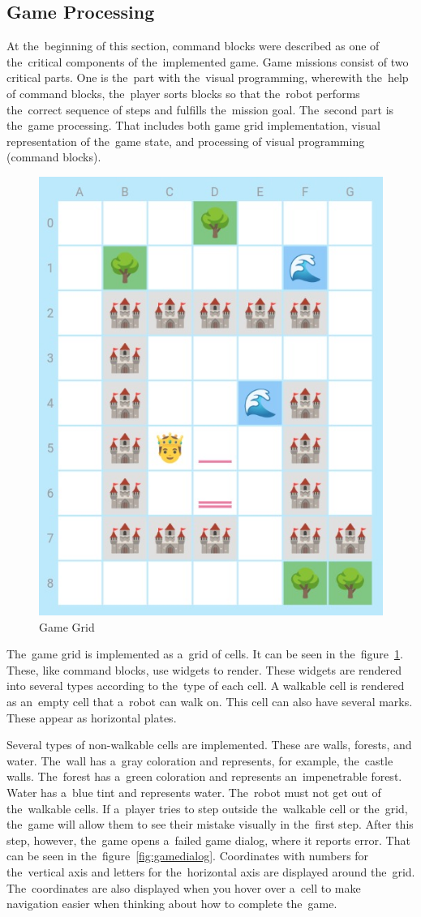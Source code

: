 \subsection{Game Processing}

At the~beginning of this section, command blocks were described as one of the~critical components of the~implemented game.
Game missions consist of two critical parts.
One is the~part with the~visual programming, wherewith the~help of command blocks, the~player sorts blocks so that the~robot performs the~correct sequence of steps and fulfills the~mission goal.
The~second part is the~game processing.
That includes both game grid implementation, visual representation of the~game state, and processing of visual programming (command blocks).

\begin{figure}
    \centering
    \includegraphics[width=0.5\linewidth]{assets/implementation/gamegrid.jpeg}
    \caption{Game Grid}
    \label{fig:gamegrid}
\end{figure}

The~game grid is implemented as a~grid of cells.
It can be seen in the~figure~\ref{fig:gamegrid}.
These, like command blocks, use widgets to render.
These widgets are rendered into several types according to the~type of each cell.
A walkable cell is rendered as an~empty cell that a~robot can walk on.
This cell can also have several marks.
These appear as horizontal plates.

Several types of non-walkable cells are implemented.
These are walls, forests, and water.
The~wall has a~gray coloration and represents, for example, the~castle walls.
The~forest has a~green coloration and represents an~impenetrable forest.
Water has a~blue tint and represents water.
The~robot must not get out of the~walkable cells.
If a~player tries to step outside the~walkable cell or the~grid, the~game will allow them to see their mistake visually in the~first step.
After this step, however, the~game opens a~failed game dialog, where it reports error.
That can be seen in the~figure~\ref{fig:gamedialog}.
Coordinates with numbers for the~vertical axis and letters for the~horizontal axis are displayed around the~grid.
The~coordinates are also displayed when you hover over a~cell to make navigation easier when thinking about how to complete the~game.

